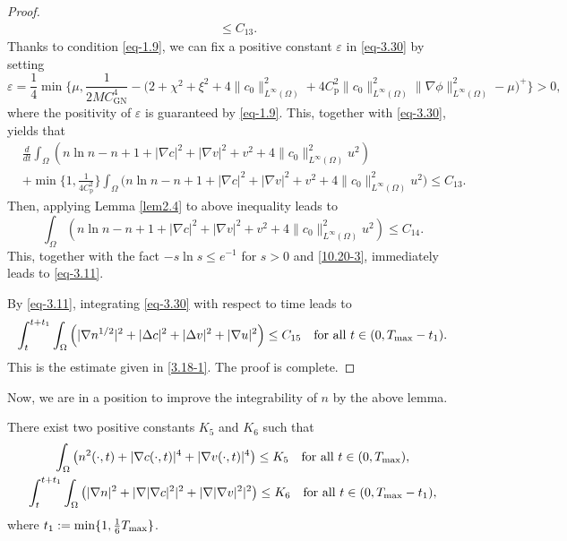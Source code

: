 \documentclass[reqno]{amsart}
\begin{document}
\begin{proof}
\begin{equation}
\begin{aligned}
&\leq  C_{13}.
\end{aligned}
\end{equation}
Thanks to condition \eqref{eq-1.9}, we can fix a positive constant $\varepsilon$ 
in \eqref{eq-3.30} by setting
\[
\varepsilon = \frac{1}{4} \min \Big\{ \mu, \frac{1}{2 M C_{\mathrm{GN}}^4} 
- \Big(2 + \chi^2 + \xi^2 + 4\|c_0\|_{L^\infty(\Omega)}^2
 + 4 C_{\mathrm{p}}^2\|c_0\|_{L^\infty(\Omega)}^2 \|\nabla \phi\|_{L^\infty(\Omega)}^2 
 - \mu\Big)^+ \Big\}>0,
\]
where the positivity of $\varepsilon$ is guaranteed by \eqref{eq-1.9}. 
This, together with \eqref{eq-3.30}, yields that
\begin{align*}
&\frac{d}{dt} \int_{\Omega} \left( n \ln n - n + 1 + |\nabla c|^2 + |\nabla v|^2 + v^2+ 4\|c_0\|_{L^\infty(\Omega)}^2 u^2\right) \\
&+ \min\big\{ 1, \frac{1}{4 C^2_{\mathrm{p}}}\big\} 
\int_{\Omega} \Big(n \ln n - n + 1 + |\nabla c|^2 + |\nabla v|^2 + v^2
 + 4\|c_0\|_{L^\infty(\Omega)}^2 u^2\Big)
\leq C_{13}.
\end{align*}
Then, applying Lemma \ref{lem2.4} to above inequality leads to
\[
\int_\Omega \left(n \ln n - n + 1 + |\nabla c|^2 + |\nabla v|^2 + v^2
+ 4\|c_0\|_{L^\infty(\Omega)}^2 u^2\right)\leq C_{14}.
\]
This, together with the fact $-s\ln s\leq e^{-1}$ for $s>0$ and \eqref{10.20-3}, 
immediately leads to \eqref{eq-3.11}.

By  \eqref{eq-3.11}, integrating \eqref{eq-3.30} with respect to time leads to
\begin{equation} \label{3.18-2}
\int_{t}^{t+t_1}\int_{\Omega}\left(|\nabla n^{1/2}|^2
+|\Delta c|^2+|\Delta v|^2+|\nabla u|^2\right)
\le C_{15} \quad\text{for all } t\in(0,T_{\rm max}-t_1).
\end{equation}
This is the estimate given in \eqref{3.18-1}.
The proof is complete.
\end{proof}

Now, we are in a position to improve the integrability of $n$ by the above lemma.

\begin{lemma}\label{lem3.6}
There exist two positive constants $K_5$ and $K_6$ such that
\begin{gather}\label{eq-3.32}
\int_{\Omega} \left(n^2(\cdot, t)+| \nabla c(\cdot, t) |^4
+ | \nabla v(\cdot, t) |^4\right) \leq K_5 \quad\text{for all }
t \in (0, T_{\rm max}), \\
\label{1-18-2}
\int_t^{t+t_1}\int_{\Omega}\left(|\nabla n|^2+|\nabla |\nabla c|^2|^2
+|\nabla |\nabla v|^2|^2\right)\leq K_{6} \quad\text{for all } 
t \in (0, T_{\rm max}-t_1),
\end{gather}
where $t_1:=\min\{1,\frac{1}{6}T_{\rm max}\}$.
\end{lemma}
\end{document}
